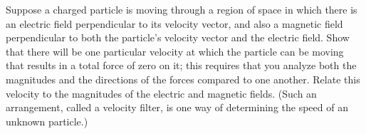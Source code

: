 Suppose a charged particle is moving through a region of space in
which there is an electric field perpendicular to its velocity vector,
and also a magnetic field perpendicular to both the particle's
velocity vector and the electric field. Show that there will be one
particular velocity at which the particle can be moving that results
in a total force of zero on it; this requires that you analyze both
the magnitudes and the directions of the forces compared to one
another. Relate this velocity to the magnitudes of the electric and
magnetic fields. (Such an arrangement, called a velocity filter, is
one way of determining the speed of an unknown particle.)
